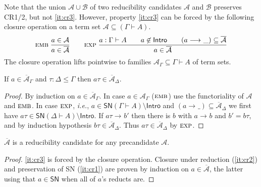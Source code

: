 \documentclass[a4paper,USenglish,cleveref, autoref, thm-restate]{lipics-v2019}
\newcommand{\ie}{\emph{i.e.}\xspace}
\newcommand{\nru}[3]{#1\;\dfrac{#2}{#3}}
\newcommand{\rulename}[1]{\ensuremath{\mbox{\textsc{#1}}}\xspace}
\newcommand{\remb}{\rulename{emb}}
\newcommand{\rexp}{\rulename{exp}}
\newcommand{\red}[1][]{\longrightarrow_{#1}}
\newcommand{\cl}[1]{\overline{#1}}
\newcommand{\A}{\mathcal{A}}
\newcommand{\B}{\mathcal{B}}
\newcommand{\SN}{\mathsf{SN}}
\newcommand{\Intro}{\mathsf{Intro}}
\begin{document}
Note that the union $\A \cup \B$ of two reducibility candidates $\A$
and $\B$ preserves CR1/2, but not \ref{it:cr3}.
However,
property \ref{it:cr3} can be forced by the following closure operation \fbox{$\cl\A$}
on a term set $\A \subseteq (\Gamma \vdash A)$.
\begin{gather*}
  \nru{\remb
    }{a \in \A
    }{a \in \cl\A
    }
\qquad
  \nru{\rexp
     }{a : \Gamma \vdash A \qquad
       a \not\in \Intro \qquad
       (a \red \_) \subseteq \cl\A
     }{a \in \cl\A}
\end{gather*}
The closure operation lifts pointwise to families
$\A_\Gamma \subseteq \Gamma \vdash A$ of term sets.
\begin{lemma}
  If $a \in \cl\A_\Gamma$ and $\tau : \Delta \leq \Gamma$ then
  $a \tau \in \cl\A_\Delta$.
\end{lemma}
\begin{proof}
  By induction on $a \in \cl\A_\Gamma$.  In case $a \in \A_\Gamma$
  (\remb) use the functoriality of $\A$ and \remb.
  In case \rexp, \ie, $a \in \SN(\Gamma \vdash A)
  \setminus \Intro$ and $(a \red\_) \subseteq \cl\A_\Delta$ we first
  have $a \tau \in \SN(\Delta \vdash A) \setminus \Intro$.  If $a\tau
  \red b'$ then there is $b$ with $a \red b$ and $b' = b\tau$, and by
  induction hypothesis $b\tau \in \cl\A_\Delta$.  Thus $a\tau \in
  \cl\A_\Delta$ by \rexp.
\end{proof}

\begin{lemma}[Saturation]
  $\cl\A$ is a reducibility candidate for any precandidate $\A$.
\end{lemma}
\begin{proof}
  \ref{it:cr3} is forced by the closure operation.
  Closure under reduction (\ref{it:cr2}) and preservation of SN
  (\ref{it:cr1}) are proven by induction on $a \in \cl\A$,
  the latter using that $a \in \SN$ when all of $a$'s reducts are.
\end{proof}

\end{document}
